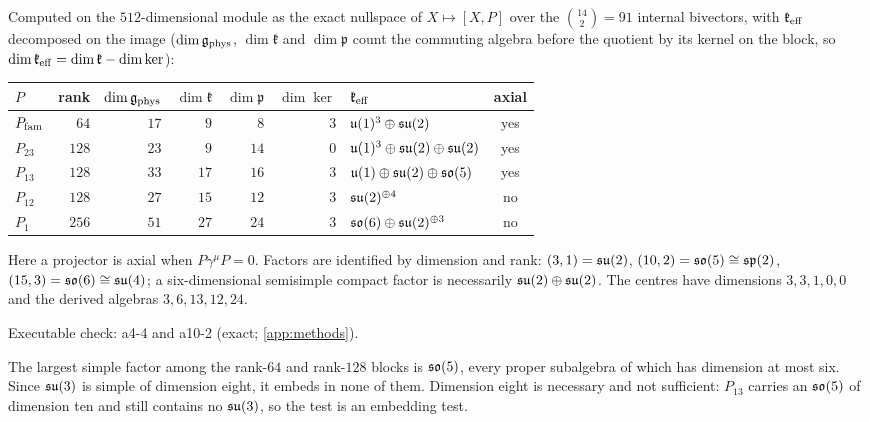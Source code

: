 \begin{theorem}
\label{thm:table}
Computed on the $512$-dimensional module as the exact nullspace of $X\mapsto[X,P]$ over the $\binom{14}2=91$ internal bivectors, with
$\mathfrak k_{\rm eff}$ decomposed on the image ($\dim\mathfrak g_{\rm phys}$, $\dim\mathfrak k$ and $\dim\mathfrak p$ count the commuting algebra before the quotient
by its kernel on the block, so $\dim\mathfrak k_{\rm eff}=\dim\mathfrak k-\dim\ker$):
\begin{center}
\begin{tabular}{@{}lrrrrrlc@{}}
\toprule
$P$ & rank & $\dim\mathfrak g_{\rm phys}$ & $\dim\mathfrak k$ & $\dim\mathfrak p$ & $\dim\ker$ & $\mathfrak k_{\rm eff}$ & axial\\
\midrule
$P_{\rm fam}$ & $64$ & $17$ & $9$ & $8$ & $3$ & $\mathfrak{u}(1)^3\oplus\mathfrak{su}(2)$ & yes\\
$P_{23}$ & $128$ & $23$ & $9$ & $14$ & $0$ & $\mathfrak{u}(1)^3\oplus\mathfrak{su}(2)\oplus\mathfrak{su}(2)$ & yes\\
$P_{13}$ & $128$ & $33$ & $17$ & $16$ & $3$ & $\mathfrak{u}(1)\oplus\mathfrak{su}(2)\oplus\mathfrak{so}(5)$ & yes\\
$P_{12}$ & $128$ & $27$ & $15$ & $12$ & $3$ & $\mathfrak{su}(2)^{\oplus4}$ & no\\
$P_1$ & $256$ & $51$ & $27$ & $24$ & $3$ & $\mathfrak{so}(6)\oplus\mathfrak{su}(2)^{\oplus3}$ & no\\
\bottomrule
\end{tabular}
\end{center}
Here a projector is axial when $P\gamma^\mu P=0$. Factors are identified by dimension and rank: $(3,1)=\mathfrak{su}(2)$, $(10,2)=\mathfrak{so}(5)\cong\mathfrak{sp}(2)$,
$(15,3)=\mathfrak{so}(6)\cong\mathfrak{su}(4)$; a six-dimensional semisimple compact factor is necessarily $\mathfrak{su}(2)\oplus\mathfrak{su}(2)$. The centres have dimensions
$3,3,1,0,0$ and the derived algebras $3,6,13,12,24$.
\end{theorem}

\noindent Executable check: a4-4 and a10-2 (exact; \cref{app:methods}).

\begin{corollary}
\label{cor:nocolour}
The largest simple factor among the rank-$64$ and rank-$128$ blocks is $\mathfrak{so}(5)$, every proper subalgebra of which has dimension at most
six. Since $\mathfrak{su}(3)$ is simple of dimension eight, it embeds in none of them. Dimension eight is necessary and not sufficient: $P_{13}$
carries an $\mathfrak{so}(5)$ of dimension ten and still contains no $\mathfrak{su}(3)$, so the test is an embedding test.
\end{corollary}

